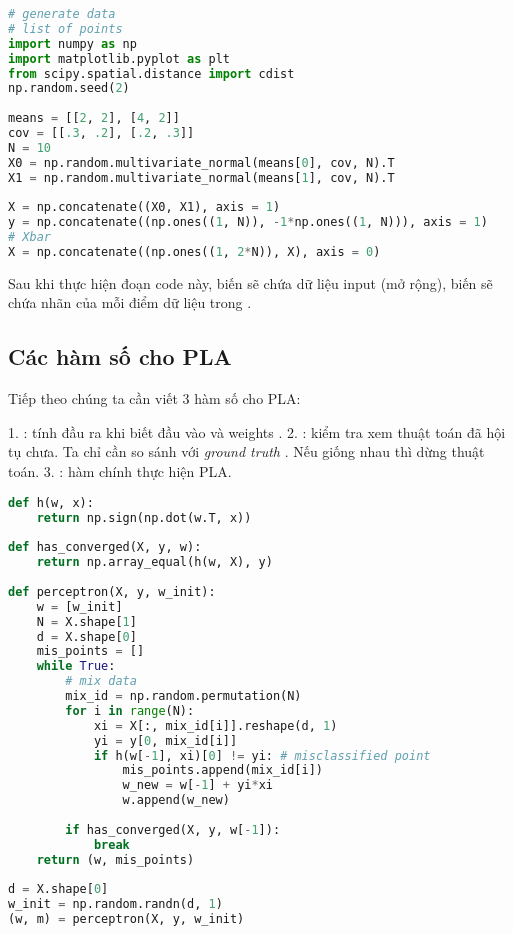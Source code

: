  
\begin{lstlisting}[language=Python]
# generate data 
# list of points  
import numpy as np  
import matplotlib.pyplot as plt 
from scipy.spatial.distance import cdist 
np.random.seed(2) 
 
means = [[2, 2], [4, 2]] 
cov = [[.3, .2], [.2, .3]] 
N = 10 
X0 = np.random.multivariate_normal(means[0], cov, N).T 
X1 = np.random.multivariate_normal(means[1], cov, N).T 
 
X = np.concatenate((X0, X1), axis = 1) 
y = np.concatenate((np.ones((1, N)), -1*np.ones((1, N))), axis = 1) 
# Xbar  
X = np.concatenate((np.ones((1, 2*N)), X), axis = 0) 
\end{lstlisting}
 
Sau khi thực hiện đoạn code này, biến  sẽ chứa dữ liệu input (mở rộng), biến  sẽ chứa nhãn của mỗi điểm dữ liệu trong . 
 
\subsection{Các hàm số cho PLA}
Tiếp theo chúng ta cần viết 3 hàm số cho PLA: 
 
1. : tính đầu ra khi biết đầu vào  và weights . 
2. : kiểm tra xem thuật toán đã hội tụ chưa. Ta chỉ cần so sánh  với \textit{ground truth} . Nếu giống nhau thì dừng thuật toán. 
3. : hàm chính thực hiện PLA. 
 
\begin{lstlisting}[language=Python]
def h(w, x):     
    return np.sign(np.dot(w.T, x)) 
 
def has_converged(X, y, w):     
    return np.array_equal(h(w, X), y)  
 
def perceptron(X, y, w_init): 
    w = [w_init] 
    N = X.shape[1] 
    d = X.shape[0] 
    mis_points = [] 
    while True: 
        # mix data  
        mix_id = np.random.permutation(N) 
        for i in range(N): 
            xi = X[:, mix_id[i]].reshape(d, 1) 
            yi = y[0, mix_id[i]] 
            if h(w[-1], xi)[0] != yi: # misclassified point 
                mis_points.append(mix_id[i]) 
                w_new = w[-1] + yi*xi  
                w.append(w_new) 
                 
        if has_converged(X, y, w[-1]): 
            break 
    return (w, mis_points) 
 
d = X.shape[0] 
w_init = np.random.randn(d, 1) 
(w, m) = perceptron(X, y, w_init) 
\end{lstlisting}
 
